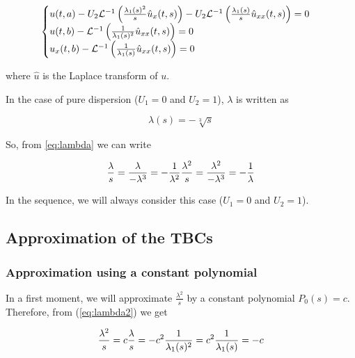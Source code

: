 \begin{equation}
\label{eq:TBC2}
    \begin{cases}
        u(t,a) - U_2 \mathcal{L}^{-1} \left( \frac{\lambda_1(s)^2}{s} \hat{u}_x(t,s) \right)  - U_2 \mathcal{L}^{-1} \left( \frac{\lambda_1(s)}{s}  \hat{u}_{xx}(t,s) \right) = 0 \\
        u(t,b) - \mathcal{L}^{-1} \left( \frac{1}{\lambda_1(s)^2}   \hat{u}_{xx}(t,s) \right) = 0 \\
        u_x(t,b) - \mathcal{L}^{-1} \left( \frac{1}{\lambda_1(s)}   \hat{u}_{xx}(t,s) \right) = 0 
    \end{cases}
\end{equation}

\noindent where $\hat{u}$ is the Laplace transform of $u$.

\indent In the case of pure dispersion ($U_1 = 0$ and $U_2 = 1$), $\lambda$ is written as

$$ \label{eq:lambda} \lambda(s) = -\sqrt[3]{s} $$

\indent So, from \eqref{eq:lambda} we can write

\begin{equation}
    \label{eq:lambda2}
    \frac{\lambda}{s} = \frac{\lambda}{-\lambda^3} = -\frac{1}{\lambda^2} \\ 
    \frac{\lambda^2}{s} = \frac{\lambda^2}{-\lambda^3} = -\frac{1}{\lambda} \\
\end{equation}

\indent In the sequence, we will always consider this case ($U_1 = 0$ and $U_2 = 1$).



\subsection{Approximation of the TBCs}

\subsubsection{Approximation using a constant polynomial}

\indent In a first moment, we will approximate $\frac{\lambda^2}{s}$ by a constant polynomial $P_0(s) = c$. Therefore, from (\ref{eq:lambda2}) we get

\begin{equation}
    \frac{\lambda^2}{s} = c \\
    \frac{\lambda}{s} = -c^2 \\
    \frac{1}{\lambda_1(s)^2} = c^2 \\
    \frac{1}{\lambda_1(s)} = -c
\end{equation}

